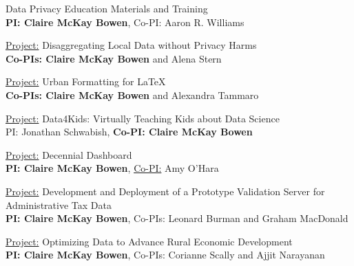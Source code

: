 \documentclass[11pt, letterpaper, roman]{moderncv} %
\begin{document}
\vspace{2pt}    
    {
        Data Privacy Education Materials and Training\\
        \textbf{PI: Claire McKay Bowen}, Co-PI: Aaron R. Williams
    }
    
\vspace{2pt}   
    {
        \underline{Project:} Disaggregating Local Data without Privacy Harms\\
        \textbf{Co-PIs: Claire McKay Bowen} and Alena Stern
    }

\vspace{2pt}    
    {
        \underline{Project:} Urban Formatting for LaTeX\\
        \textbf{Co-PIs: Claire McKay Bowen} and Alexandra Tammaro
    }

\vspace{2pt}    
    {
        \underline{Project:} Data4Kids: Virtually Teaching Kids about Data Science\\
        PI: Jonathan Schwabish, \textbf{Co-PI: Claire McKay Bowen}
    }

\vspace{2pt}
    {
        \underline{Project:} Decennial Dashboard\\
        \textbf{PI: Claire McKay Bowen}, \underline{Co-PI:} Amy O'Hara
    }

\vspace{2pt}
    {
        \underline{Project:} Development and Deployment of a Prototype Validation Server for Administrative Tax Data\\
        \textbf{PI: Claire McKay Bowen}, Co-PIs: Leonard Burman and Graham MacDonald
    }

\vspace{2pt}
    {
        \underline{Project:} Optimizing Data to Advance Rural Economic Development\\
        \textbf{PI: Claire McKay Bowen}, Co-PIs: Corianne Scally and Ajjit Narayanan
    }
\end{document}

